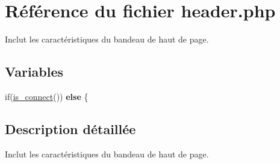 \hypertarget{header_8php}{}\section{Référence du fichier header.\+php}
\label{header_8php}


Inclut les caractéristiques du bandeau de haut de page.  


\subsection*{Variables}
\begin{DoxyCompactItemize}
\item 
\mbox{\label{header_8php_a714599e1ba6002219f3eed1abc07f804}} 
if(\hyperlink{fonctionCompte_8php_a2fe594e0482307b8729ea37780d6f74b}{is\+\_\+connect}()) {\bfseries else} \{
\end{DoxyCompactItemize}


\subsection{Description détaillée}
Inclut les caractéristiques du bandeau de haut de page. 

